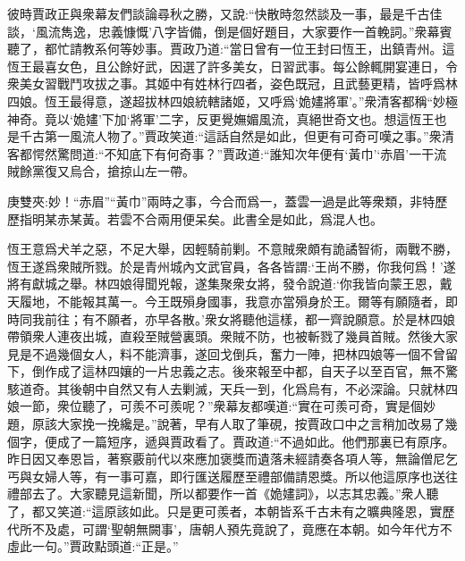 \begin{parag}
    彼時賈政正與衆幕友們談論尋秋之勝，又說:“快散時忽然談及一事，最是千古佳談，‘風流雋逸，忠義慷慨’八字皆備，倒是個好題目，大家要作一首輓詞。”衆幕賓聽了，都忙請教系何等妙事。賈政乃道:“當日曾有一位王封曰恆王，出鎮青州。這恆王最喜女色，且公餘好武，因選了許多美女，日習武事。每公餘輒開宴連日，令衆美女習戰鬥攻拔之事。其姬中有姓林行四者，姿色既冠，且武藝更精，皆呼爲林四娘。恆王最得意，遂超拔林四娘統轄諸姬，又呼爲‘姽嫿將軍’。”衆清客都稱“妙極神奇。竟以‘姽嫿’下加‘將軍’二字，反更覺嫵媚風流，真絕世奇文也。想這恆王也是千古第一風流人物了。”賈政笑道:“這話自然是如此，但更有可奇可嘆之事。”衆清客都愕然驚問道:“不知底下有何奇事？”賈政道:“誰知次年便有‘黃巾’‘赤眉’一干流賊餘黨復又烏合，搶掠山左一帶。\begin{note}庚雙夾:妙！“赤眉”“黃巾”兩時之事，今合而爲一，蓋雲一過是此等衆類，非特歷歷指明某赤某黃。若雲不合兩用便呆矣。此書全是如此，爲混人也。\end{note}恆王意爲犬羊之惡，不足大舉，因輕騎前剿。不意賊衆頗有詭譎智術，兩戰不勝，恆王遂爲衆賊所戮。於是青州城內文武官員，各各皆謂:‘王尚不勝，你我何爲！’遂將有獻城之舉。林四娘得聞兇報，遂集聚衆女將，發令說道:‘你我皆向蒙王恩，戴天履地，不能報其萬一。今王既殞身國事，我意亦當殞身於王。爾等有願隨者，即時同我前往；有不願者，亦早各散。’衆女將聽他這樣，都一齊說願意。於是林四娘帶領衆人連夜出城，直殺至賊營裏頭。衆賊不防，也被斬戮了幾員首賊。然後大家見是不過幾個女人，料不能濟事，遂回戈倒兵，奮力一陣，把林四娘等一個不曾留下，倒作成了這林四孃的一片忠義之志。後來報至中都，自天子以至百官，無不驚駭道奇。其後朝中自然又有人去剿滅，天兵一到，化爲烏有，不必深論。只就林四娘一節，衆位聽了，可羨不可羨呢？”衆幕友都嘆道:“實在可羨可奇，實是個妙題，原該大家挽一挽纔是。”說著，早有人取了筆硯，按賈政口中之言稍加改易了幾個字，便成了一篇短序，遞與賈政看了。賈政道:“不過如此。他們那裏已有原序。昨日因又奉恩旨，著察覈前代以來應加褒獎而遺落未經請奏各項人等，無論僧尼乞丐與女婦人等，有一事可嘉，即行匯送履歷至禮部備請恩獎。所以他這原序也送往禮部去了。大家聽見這新聞，所以都要作一首《姽嫿詞》，以志其忠義。”衆人聽了，都又笑道:“這原該如此。只是更可羨者，本朝皆系千古未有之曠典隆恩，實歷代所不及處，可謂‘聖朝無闕事’，唐朝人預先竟說了，竟應在本朝。如今年代方不虛此一句。”賈政點頭道:“正是。”
\end{parag}


